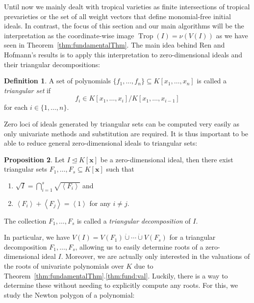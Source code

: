 \documentclass[
  paper=a4,
  titlepage,
  bibliography=totoc,
  listof=totoc,
  pagesize=pdftex
]{scrartcl}
\numberwithin{figure}{section}
\numberwithin{equation}{section}
\numberwithin{table}{section}
\newcommand*\dotcup{\mathbin{\dot{\cup}}}
\newcommand*\ideal[1]{\left\langle #1 \right\rangle}
\let\vec\mathbf
\let\idealof\trianglelefteq
\DeclareMathOperator{\Trop}{Trop}
\theoremstyle{definition}
\newtheorem{definition}{Definition}
\newtheorem{proposition}[definition]{Proposition}
\numberwithin{definition}{section}
\begin{document}
Until now we mainly dealt with tropical varieties as finite intersections of tropical
prevarieties or the set of all weight vectors that define monomial-free initial ideals. In
contrast, the focus of this section and our main algorithms will be the interpretation as
the coordinate-wise image $\Trop(I) = \nu(V(I))$ as we have seen in
Theorem~\ref{thm:fundamentalThm}. The main idea behind Ren and Hofmann's results is to
apply this interpretation to zero-dimensional ideals and their triangular decompositions:

\begin{definition}
  \label{def:triangSet}
  A set of polynomials $\{ f_1, \dots, f_n \} \subseteq K[x_1, \dots, x_n]$ is called a
  \emph{triangular set} if
  \[
    f_i \in K[x_1, \dots, x_i] / K[x_1, \dots, x_{i-1}]
  \]
  for each $i \in \{1, \dots, n\}$.
\end{definition}

Zero loci of ideals generated by triangular sets can be computed very easily as only
univariate methods and substitution are required. It is thus important to be able to
reduce general zero-dimensional ideals to triangular sets:

\begin{proposition}
  Let $I \idealof K[\vec x]$ be a zero-dimensional ideal, then there exist triangular sets
  $F_1, \dots, F_s \subseteq K[\vec x]$ such that
  \begin{enumerate}
    \item $\sqrt I = \bigcap_{i=1}^s \sqrt{\ideal{F_i}}$ and
    \item $\ideal{F_i} + \ideal{F_j} = \ideal1$ for any $i\neq j$.
  \end{enumerate}
  The collection $F_1, \dots, F_s$ is called a \emph{triangular decomposition} of $I$.
  \label{prp:triang}
\end{proposition}

In particular, we have $V(I) = V(F_1) \dotcup \cdots \dotcup V(F_s)$ for a triangular
decomposition $F_1, \dots, F_s$, allowing us to easily determine roots of a
zero-dimensional ideal $I$. Moreover, we are actually only interested in the valuations of
the roots of univariate polynomials over $K$ due to
Theorem~\ref{thm:fundamentalThm}.\ref{thm:fund:val}. Luckily, there is a way to determine
these without needing to explicitly compute any roots. For this, we study the Newton
polygon of a polynomial:
\end{document}
